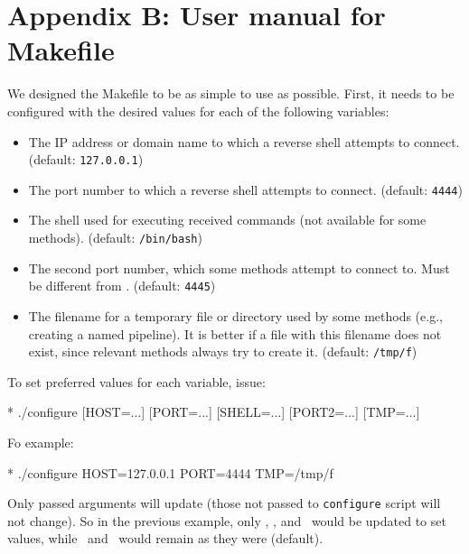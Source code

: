 \newcommand{\target}{\textcolor{placeholder}{\texttt{$\langle$target$\rangle$}}}

\chapter*{Appendix B: User manual for Makefile}

We designed the Makefile to be as simple to use as possible. First, it needs to be configured with the desired values for each of the following variables:

\setlength{\leftmargini}{5em}
\begin{itemize}
\item[\host] The IP address or domain name to which a reverse shell attempts to connect. (default: \texttt{127.0.0.1})
\item[\port] The port number to which a reverse shell attempts to connect. (default: \texttt{4444})
\item[\shell] The shell used for executing received commands (not available for some methods). (default: \texttt{/bin/bash})
\item[\portt] The second port number, which some methods attempt to connect to. Must be different from \port. (default: \texttt{4445})
\item[\tmp] The filename for a temporary file or directory used by some methods (e.g., creating a named pipeline). It is better if a file with this filename does not exist, since relevant methods always try to create it. (default: \texttt{/tmp/f})
\end{itemize}
\setlength{\leftmargini}{2.5em}

To set preferred values for each variable, issue:

\begin{cmdline}{*}{}{}
./configure [HOST=...] [PORT=...] [SHELL=...] [PORT2=...] [TMP=...]
\end{cmdline}

Fo example:

\begin{cmdline}{*}{}{}
./configure HOST=127.0.0.1 PORT=4444 TMP=/tmp/f
\end{cmdline}

Only passed arguments will update (those not passed to \texttt{configure} script will not change). So in the previous example, only \host, \port, and \tmp\ would be updated to set values, while \shell\ and \portt\ would remain as they were (default).

